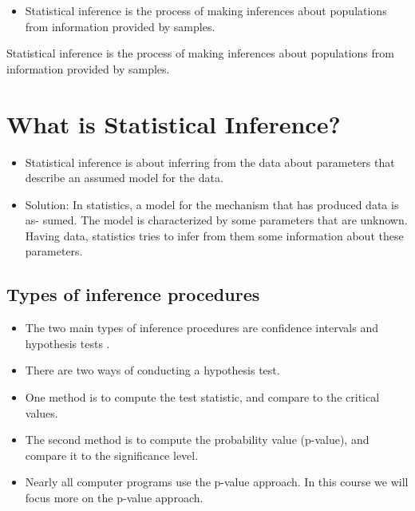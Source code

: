 
\begin{itemize}
\item 
Statistical inference is the process of making inferences about populations from information provided by samples.
\end{itemize}







Statistical inference is the process of making inferences about populations from information provided by samples.

\section{What is Statistical Inference?}

\begin{itemize}
\item Statistical inference is about inferring from the data about parameters that describe an assumed
model for the data.
\item 
Solution: In statistics, a model for the mechanism that has produced data is as-
sumed. The model is characterized by some parameters that are unknown. Having
data, statistics tries to infer from them some information about these parameters.
\end{itemize}


\subsection{Types of inference procedures}

\begin{itemize}
\item The two main types of inference procedures are confidence intervals and hypothesis tests .\item There are two ways of conducting a hypothesis test.\item  One method is to compute the test statistic, and compare to the critical values.\item The second method is to compute the probability value (p-value), and compare it to the significance level.\item Nearly all computer programs use the p-value approach. In this course we will focus more on the p-value approach.
\end{itemize}

